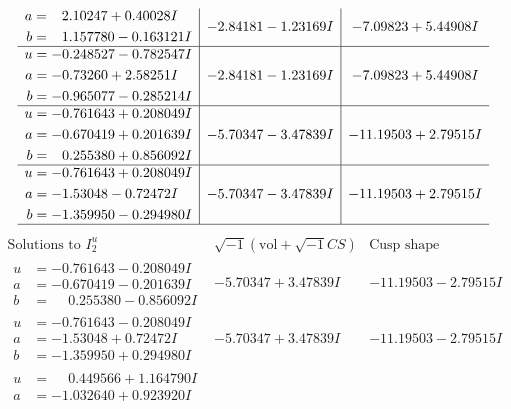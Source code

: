 \documentclass[1p]{elsarticle_modified}
\theoremstyle{definition}
\newcommand{\I}{\sqrt{-1}}
\begin{document}
$$\begin{array}{c|c|c}
\begin{aligned}
a &= \phantom{-}2.10247 + 0.40028 I \\
b &= \phantom{-}1.157780 - 0.163121 I\end{aligned}
 & -2.84181 - 1.23169 I & -7.09823 + 5.44908 I \\ \hline\begin{aligned}
u &= -0.248527 - 0.782547 I \\
a &= -0.73260 + 2.58251 I \\
b &= -0.965077 - 0.285214 I\end{aligned}
 & -2.84181 - 1.23169 I & -7.09823 + 5.44908 I \\ \hline\begin{aligned}
u &= -0.761643 + 0.208049 I \\
a &= -0.670419 + 0.201639 I \\
b &= \phantom{-}0.255380 + 0.856092 I\end{aligned}
 & -5.70347 - 3.47839 I & -11.19503 + 2.79515 I \\ \hline\begin{aligned}
u &= -0.761643 + 0.208049 I \\
a &= -1.53048 - 0.72472 I \\
b &= -1.359950 - 0.294980 I\end{aligned}
 & -5.70347 - 3.47839 I & -11.19503 + 2.79515 I\\
 \hline 
 \end{array}$$\newpage$$\begin{array}{c|c|c}  
\text{Solutions to }I^u_{2}& \I (\text{vol} + \sqrt{-1}CS) & \text{Cusp shape}\\
 \hline 
\begin{aligned}
u &= -0.761643 - 0.208049 I \\
a &= -0.670419 - 0.201639 I \\
b &= \phantom{-}0.255380 - 0.856092 I\end{aligned}
 & -5.70347 + 3.47839 I & -11.19503 - 2.79515 I \\ \hline\begin{aligned}
u &= -0.761643 - 0.208049 I \\
a &= -1.53048 + 0.72472 I \\
b &= -1.359950 + 0.294980 I\end{aligned}
 & -5.70347 + 3.47839 I & -11.19503 - 2.79515 I \\ \hline\begin{aligned}
u &= \phantom{-}0.449566 + 1.164790 I \\
a &= -1.032640 + 0.923920 I \\

\end{aligned}
\end{array}$$
\end{document}
